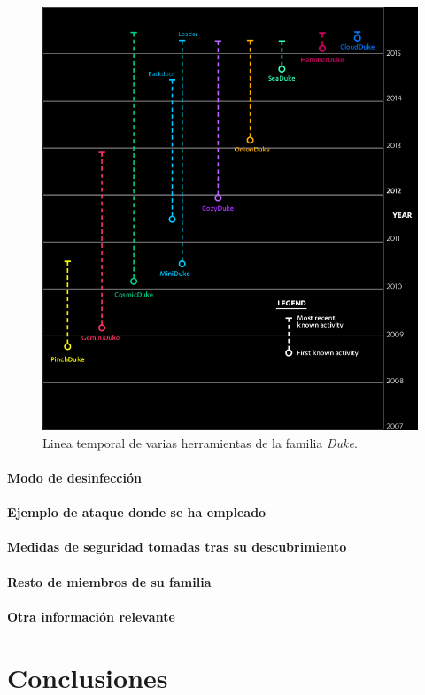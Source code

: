 \documentclass[11pt,a4paper]{article}
\begin{document}
\begin{figure}[h]
  \centering
  \includegraphics[width=\textwidth]{./referencias/timeline.png}
  \caption[Linea temporal \emph{Dukes}.]{Linea temporal de varias
    herramientas de la familia \emph{Duke}.}
  \label{fig:timeline}
\end{figure}

\paragraph{Modo de desinfección}
\paragraph{Ejemplo de ataque donde se ha empleado}
\paragraph{Medidas de seguridad tomadas tras su descubrimiento}
\paragraph{Resto de miembros de su familia}
\paragraph{Otra información relevante}

\section{Conclusiones}
\label{sec:conclusiones}


\end{document}
